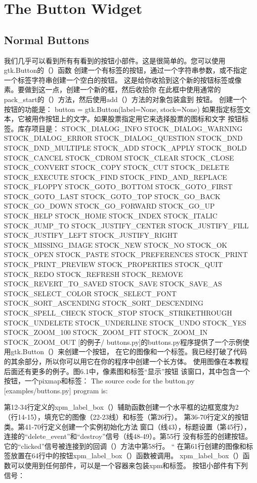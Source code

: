 \chapter{The Button Widget}
\section{Normal Buttons}
我们几乎可以看到所有有看到的按钮小部件。这是很简单的。您可以使用gtk.Button的（）函数
创建一个有标签的按钮，通过一个字符串参数，或不指定一个标签字符串创建一个空白的按钮。
这是给你收拾到这个新的按钮标签或像素。要做到这一点，创建一个新的框，然后收拾你
在此框中使用通常的pack_start的（）方法，然后使用add（）方法的对象包装盒到
按钮。
创建一个按钮的功能是：
button = gtk.Button(label=None, stock=None)
如果指定标签文本，它被用作按钮上的文字。如果股票指定用它来选择股票的图​​标和文字
按钮标签。库存项目是：	
STOCK_DIALOG_INFO
STOCK_DIALOG_WARNING
STOCK_DIALOG_ERROR
STOCK_DIALOG_QUESTION
STOCK_DND
STOCK_DND_MULTIPLE
STOCK_ADD
STOCK_APPLY
STOCK_BOLD
STOCK_CANCEL
STOCK_CDROM
STOCK_CLEAR
STOCK_CLOSE
STOCK_CONVERT
STOCK_COPY
STOCK_CUT
STOCK_DELETE
STOCK_EXECUTE
STOCK_FIND
STOCK_FIND_AND_REPLACE
STOCK_FLOPPY
STOCK_GOTO_BOTTOM
STOCK_GOTO_FIRST
STOCK_GOTO_LAST
STOCK_GOTO_TOP
STOCK_GO_BACK
STOCK_GO_DOWN
STOCK_GO_FORWARD
STOCK_GO_UP
STOCK_HELP
STOCK_HOME
STOCK_INDEX
STOCK_ITALIC
STOCK_JUMP_TO
STOCK_JUSTIFY_CENTER
STOCK_JUSTIFY_FILL
STOCK_JUSTIFY_LEFT
STOCK_JUSTIFY_RIGHT
STOCK_MISSING_IMAGE
STOCK_NEW
STOCK_NO
STOCK_OK
STOCK_OPEN
STOCK_PASTE
STOCK_PREFERENCES
STOCK_PRINT
STOCK_PRINT_PREVIEW
STOCK_PROPERTIES
STOCK_QUIT
STOCK_REDO
STOCK_REFRESH
STOCK_REMOVE
STOCK_REVERT_TO_SAVED
STOCK_SAVE
STOCK_SAVE_AS
STOCK_SELECT_COLOR
STOCK_SELECT_FONT
STOCK_SORT_ASCENDING
STOCK_SORT_DESCENDING
STOCK_SPELL_CHECK
STOCK_STOP
STOCK_STRIKETHROUGH
STOCK_UNDELETE
STOCK_UNDERLINE
STOCK_UNDO
STOCK_YES
STOCK_ZOOM_100
STOCK_ZOOM_FIT
STOCK_ZOOM_IN
STOCK_ZOOM_OUT
[的例子/ buttons.py]的buttons.py程序提供了一个示例使用gtk.Button（）来创建一个按钮，
在它的图像和一个标签。我已经打破了代码的其余部分，所以你可以用它在你的程序中创建一个长方体。
使用图像在本教程后面还有更多的例子。图6.1中，像素图和标签“显示”按钮
该窗口，其中包含一个按钮，一个pixmap和标签：	
The source code for the button.py [examples/buttons.py] program is:

第12-34行定义的xpm_label_box（）辅助函数创建一个水平框的边框宽度为2
（行14-15），填充它的图像（22-23线）和标签（第26行）。
第36-70行定义的按钮类。第41-70行定义创建一个实例初始化方法
窗口（线43），标题设置（第45行），连接的“delete_event”和“destroy”信号（线48-49）。第55行
没有标签的创建按钮。它的“clicked”信号被连接到的回调（）方法中第58行。 “
在第61行创建的图像和标签放置在64行中的按钮xpm_label_box（）函数被调用。
xpm_label_box（）函数可以使用到任何部件，可以是一个容器来包装xpm和标签。
按钮小部件有下列信号：

